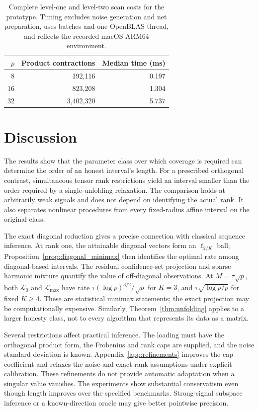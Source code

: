 \documentclass[11pt]{article}
\theoremstyle{remark}
\begin{document}
\begin{table}[ht]
\centering\small
\begin{tabular}{rrr}
\toprule
$p$ & Product contractions & Median time (ms)\\
\midrule
8 & 192,116 & 0.197 \\
16 & 823,208 & 1.304 \\
32 & 3,402,320 & 5.737 \\
\bottomrule
\end{tabular}
\caption{Complete level-one and level-two scan costs for the prototype. Timing excludes noise generation and net preparation, uses batches and one OpenBLAS thread, and reflects the recorded macOS ARM64 environment.}\label{tab:scan_runtime}
\end{table}

\section{Discussion}\label{sec:discussion}

The results show that the parameter class over which coverage is required can determine the order of an honest interval's length. For a prescribed orthogonal contrast, simultaneous tensor rank restrictions yield an interval smaller than the order required by a single-unfolding relaxation. The comparison holds at arbitrarily weak signals and does not depend on identifying the actual rank. It also separates nonlinear procedures from every fixed-radius affine interval on the original class.

The exact diagonal reduction gives a precise connection with classical sequence inference. At rank one, the attainable diagonal vectors form an $\ell_{2/K}$ ball; Proposition~\ref{prop:diagonal_minimax} then identifies the optimal rate among diagonal-based intervals. The residual confidence-set projection and sparse harmonic mixture quantify the value of off-diagonal observations. At $M=\tau\sqrt p$, both $\mathcal L_0$ and $\mathcal L_{\max}$ have rate $\tau(\log p)^{3/2}/\sqrt p$ for $K=3$, and $\tau\sqrt{\log p/p}$ for fixed $K\ge4$. These are statistical minimax statements; the exact projection may be computationally expensive. Similarly, Theorem~\ref{thm:unfolding} applies to a larger honesty class, not to every algorithm that represents its data as a matrix.

Several restrictions affect practical inference. The loading must have the orthogonal product form, the Frobenius and rank caps are supplied, and the noise standard deviation is known. Appendix~\ref{app:refinements} improves the cap coefficient and relaxes the noise and exact-rank assumptions under explicit calibration. These refinements do not provide automatic adaptation when a singular value vanishes. The experiments show substantial conservatism even though length improves over the specified benchmarks. Strong-signal subspace inference or a known-direction oracle may give better pointwise precision.
\end{document}
